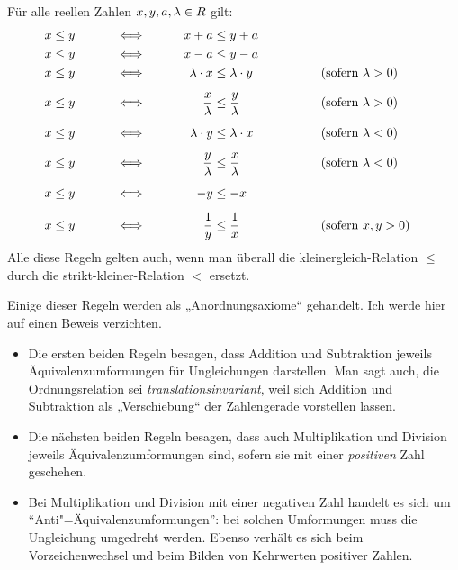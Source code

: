 \begin{satz} \label{ungleichungregeln}
    Für alle reellen Zahlen $x,y,a,\lambda\in \relax R$ gilt:
    \begingroup
    \allowdisplaybreaks
    \begin{alignat*}{4}
        x&\le y &\qquad&\iff&\qquad x+a&\le y+a \\
        x&\le y &\qquad&\iff&\qquad x-a&\le y-a \\
        x&\le y &\qquad&\iff&\qquad \lambda \cdot x&\le \lambda \cdot y &\qquad&\qquad (\textnormal{sofern $\lambda>0$}) \\[0.5em]
        x&\le y &\qquad&\iff&\qquad \frac{x}{\lambda} &\le \frac{y}{\lambda} &\qquad&\qquad (\textnormal{sofern $\lambda>0$}) \\[0.5em]
        x&\le y &\qquad&\iff&\qquad \lambda \cdot y&\le \lambda \cdot x &\qquad&\qquad (\textnormal{sofern $\lambda<0$}) \\[0.5em]
        x&\le y &\qquad&\iff&\qquad \frac{y}{\lambda} &\le \frac{x}{\lambda} &\qquad&\qquad (\textnormal{sofern $\lambda<0$}) \\[0.5em]
        x&\le y &\qquad &\iff&\qquad -y&\le -x \\[0.5em]
        x&\le y &\qquad&\iff&\qquad \frac{1}{y} & \le\frac{1}{x} &\qquad&\qquad (\textnormal{sofern $x,y>0$})
    \end{alignat*}
    \endgroup
    Alle diese Regeln gelten auch, wenn man überall die kleinergleich-Relation $\le$ durch die strikt-kleiner-Relation $<$ ersetzt.
\end{satz}


\begin{bem} \label{ungleichungerklaerung}
    Einige dieser Regeln werden als „Anordnungsaxiome“ gehandelt. Ich werde hier auf einen Beweis verzichten.
    \begin{itemize}
        \item Die ersten beiden Regeln besagen, dass Addition und Subtraktion jeweils Äquivalenzumformungen für Ungleichungen darstellen. Man sagt auch, die Ordnungsrelation sei \emph{translationsinvariant}, weil sich Addition und Subtraktion als „Verschiebung“ der Zahlengerade vorstellen lassen.
        \item Die nächsten beiden Regeln besagen, dass auch Multiplikation und Division jeweils Äquivalenzumformungen sind, sofern sie mit einer \emph{positiven} Zahl geschehen.
        \item Bei Multiplikation und Division mit einer negativen Zahl handelt es sich um \enquote{Anti"=Äquivalenzumformungen}: bei solchen Umformungen muss die Ungleichung umgedreht werden. Ebenso verhält es sich beim Vorzeichenwechsel und beim Bilden von Kehrwerten positiver Zahlen.
    \end{itemize}
\end{bem}


